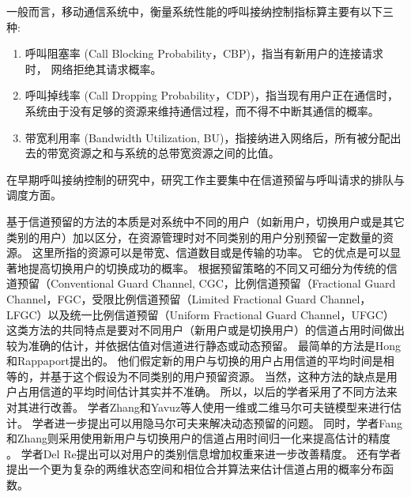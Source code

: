 一般而言，移动通信系统中，衡量系统性能的呼叫接纳控制指标算主要有以下三种:
\begin{enumerate}[(1)]
\item 呼叫阻塞率  (Call Blocking Probability，CBP)，指当有新用户的连接请求时， 网络拒绝其请求概率。
\item 呼叫掉线率  (Call Dropping Probability，CDP)，指当现有用户正在通信时，系统由于没有足够的资源来维持通信过程，而不得不中断其通信的概率。
\item 带宽利用率 (Bandwidth Utilization, BU)，指接纳进入网络后，所有被分配出去的带宽资源之和与系统的总带宽资源之间的比值。
\end{enumerate}

在早期呼叫接纳控制的研究中，研究工作主要集中在信道预留与呼叫请求的排队与调度方面。

基于信道预留的方法的本质是对系统中不同的用户（如新用户，切换用户或是其它类别的用户）加以区分，在资源管理时对不同类别的用户分别预留一定数量的资源。
这里所指的资源可以是带宽、信道数目或是传输的功率。
它的优点是可以显著地提高切换用户的切换成功的概率。
根据预留策略的不同又可细分为传统的信道预留（Conventional Guard Channel, CGC\cite{Hong:1986}\cite{Lunayach:1982}\cite{Posner:1985}，比例信道预留（Fractional Guard Channel，FGC\cite{Ramjee:1997}\cite{Y-G-Fang.TVT.2002}\cite{Vazquez:2006}，受限比例信道预留（Limited Fractional Guard Channel，LFGC）\cite{CruzPerez:1999}以及统一比例信道预留（Uniform Fractional Guard Channel，UFGC）\cite{Beigy:2004}
这类方法的共同特点是要对不同用户（新用户或是切换用户）的信道占用时间做出较为准确的估计，并依据估值对信道进行静态或动态预留。
最简单的方法是Hong和Rappaport提出的\cite{Hong:1986}。
他们假定新的用户与切换的用户占用信道的平均时间是相等的，并基于这个假设为不同类别的用户预留资源。
当然，这种方法的缺点是用户占用信道的平均时间估计其实并不准确。 所以，以后的学者采用了不同方法来对其进行改善。
学者Zhang和Yavuz等人使用一维或二维马尔可夫链模型来进行估计\cite{Zhang:2003}\cite{Yavuz:2006}\cite{Sindal:2008}。
学者进一步提出可以用隐马尔可夫来解决动态预留的问题\cite{LeeWu:2006}。
同时，学者Fang和Zhang则采用使用新用户与切换用户的信道占用时间归一化来提高估计的精度 \cite{Y-G-Fang.TVT.2002}。
学者Del Re提出可以对用户的类别信息增加权重来进一步改善精度\cite{Del1995}。
还有学者提出一个更为复杂的两维状态空间和相位合并算法来估计信道占用的概率分布函数\cite{Melikov:2006}。

